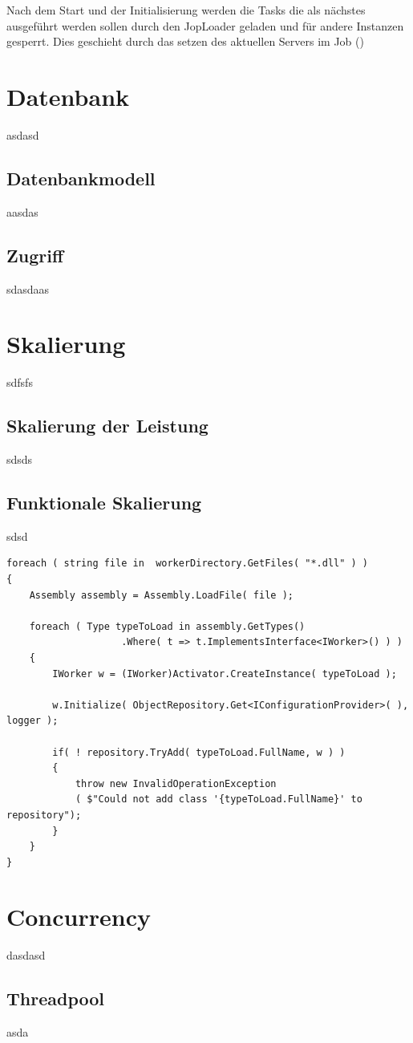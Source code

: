 Nach dem Start und der Initialisierung werden die Tasks die als nächstes ausgeführt werden sollen durch den JopLoader geladen und für andere Instanzen gesperrt. Dies geschieht durch das setzen des aktuellen Servers im Job ()
\section{Datenbank}
asdasd
\subsection{Datenbankmodell}
aasdas
\subsection{Zugriff}
sdasdaas
\section{Skalierung}
sdfsfs
\subsection{Skalierung der Leistung}
sdsds
\subsection{Funktionale Skalierung}
sdsd
\begin{lstlisting}[caption={Dynamic Loading, siehe WorkerRepository.cs - LoadAllWorkers()},label={lst:dynamicloading},captionpos=b]
foreach ( string file in  workerDirectory.GetFiles( "*.dll" ) )
{
	Assembly assembly = Assembly.LoadFile( file );

	foreach ( Type typeToLoad in assembly.GetTypes()
					.Where( t => t.ImplementsInterface<IWorker>() ) )
	{
		IWorker w = (IWorker)Activator.CreateInstance( typeToLoad );

		w.Initialize( ObjectRepository.Get<IConfigurationProvider>( ), logger );

		if( ! repository.TryAdd( typeToLoad.FullName, w ) )
		{
			throw new InvalidOperationException
			( $"Could not add class '{typeToLoad.FullName}' to repository");
		}
	}
}
\end{lstlisting}
\section{Concurrency}
dasdasd
\subsection{Threadpool}
asda
